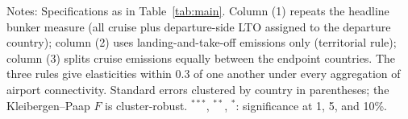 \documentclass[12pt]{extarticle}
\begin{document}
\begin{table}[H]
{\begin{threeparttable}
\begin{tabular}{lccc}
\bottomrule
\end{tabular}
\begin{tablenotes}[flushleft]
\footnotesize
\item Notes: Specifications as in Table~\ref{tab:main}. Column (1) repeats the headline bunker measure (all cruise plus departure-side LTO assigned to the departure country); column (2) uses landing-and-take-off emissions only (territorial rule); column (3) splits cruise emissions equally between the endpoint countries. The three rules give elasticities within 0.3 of one another under every aggregation of airport connectivity. Standard errors clustered by country in parentheses; the Kleibergen--Paap $F$ is cluster-robust. $^{***}$, $^{**}$, $^{*}$: significance at 1, 5, and 10\%.
\end{tablenotes}
\end{threeparttable}}
\end{table}
\end{document}
